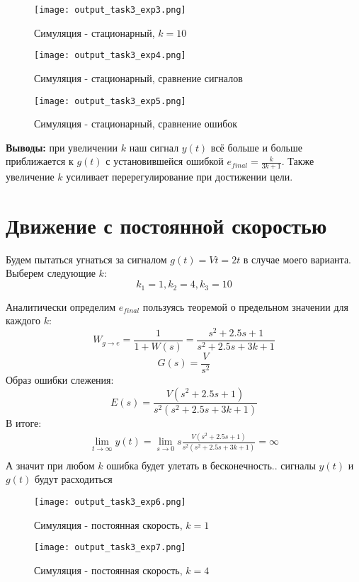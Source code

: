 \begin{figure}[ht]
  \centering
  \texttt{[image: output\_task3\_exp3.png]}
\caption{Симуляция - стационарный, $k=10$}
\end{figure}

\newpage
\begin{figure}[ht]
  \centering
  \texttt{[image: output\_task3\_exp4.png]}
\caption{Симуляция - стационарный, сравнение сигналов}
\end{figure}

\begin{figure}[ht]
  \centering
  \texttt{[image: output\_task3\_exp5.png]}
\caption{Симуляция - стационарный, сравнение ошибок}
\end{figure}

\newpage
\textbf{Выводы:} при увеличении $k$ наш сигнал $y(t)$ всё больше и больше приближается к $g(t)$ с установившейся ошибкой $e_{final} = \frac{k}{3k+1}$.
Также увеличение $k$ усиливает перерегулирование при достижении цели.

\section{Движение с постоянной скоростью}
Будем пытаться угнаться за сигналом $g(t) = Vt = 2t$ в случае моего варианта.
Выберем следующие $k$:
$$
k_1 = 1, k_2 = 4,  k_3 = 10
$$

Аналитически определим $e_{final}$ пользуясь теоремой о предельном значении для каждого $k$:
$$
W_{g\to e} = \frac{1}{1+W(s)} = \frac{s^2 +2.5s + 1}{s^2 + 2.5s + 3k + 1}
$$
$$
G(s) = \frac{V}{s^2}
$$
Образ ошибки слежения:
$$
E(s) = \frac{V(s^2 +2.5s + 1)}{s^2(s^2 + 2.5s + 3k + 1)}
$$
В итоге:
$$
\begin{aligned}
  \lim_{t\to\infty} y(t) = \lim_{s\to 0}s\frac{V(s^2 +2.5s + 1)}{s^2(s^2 + 2.5s + 3k + 1)} = \infty \\
\end{aligned}
$$
А значит при любом $k$ ошибка будет улетать в бесконечность.. сигналы $y(t)$ и $g(t)$ будут расходиться

\begin{figure}[ht]
  \centering
  \texttt{[image: output\_task3\_exp6.png]}
\caption{Симуляция - постоянная скорость, $k=1$}
\end{figure}

\newpage
\begin{figure}[ht]
  \centering
  \texttt{[image: output\_task3\_exp7.png]}
\caption{Симуляция - постоянная скорость, $k=4$}
\end{figure}

